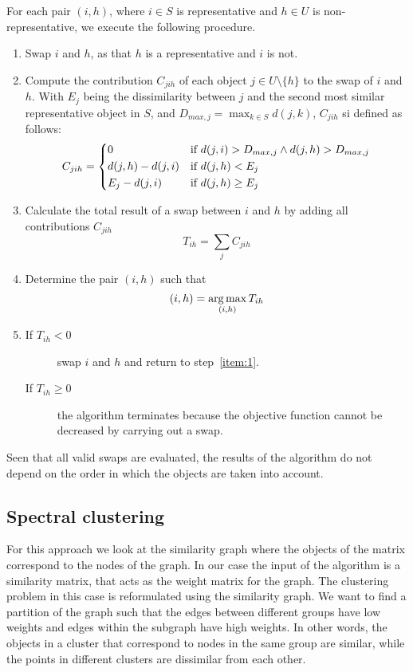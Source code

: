 For each pair $(i,h)$, where $i \in S$ is representative and $h \in U$ is non-representative, we execute the following procedure.
\begin{enumerate}
    \item Swap $i$ and $h$, as that $h$ is a representative and $i$ is not.\label{item:1}
    \item Compute the contribution $C_{jih}$ of each object $j \in U\setminus \{h\}$ to the swap of $i$ and $h$. With $E_j$ being the dissimilarity between $j$ and the second most similar representative object in $S$, and $D_{max,j} = \max_{k\in S}{d(j,k)}$, $C_{jih}$ si defined as follows:
    \begin{equation*}
        C_{jih}=
        \begin{dcases}
            0 & \text{if } d(j,i)> D_{max,j}\land d(j,h)> D_{max,j}\\
            d(j,h)-d(j,i) & \text{if } d(j,h)<E_j  \\
            E_j-d(j,i) & \text{if } d(j,h)\geq E_j \\
        \end{dcases}
    \end{equation*}  
    \item Calculate the total result of a swap between $i$ and $h$ by adding all contributions $C_{jih}$
    \begin{equation*}
        T_{ih}=\sum_j{C_{jih}}
    \end{equation*}
    \item Determine the pair $(i,h)$ such that
    \begin{equation*}
        (i,h)=\operatorname*{arg\,max}_{(i,h)}{T_{ih}}
    \end{equation*}
    \item 
    \begin{description}
        \item[If \boldmath$T_{ih}<0$] swap $i$ and $h$ and return to step~\ref{item:1}.
        \item[If \boldmath$T_{ih}\geq 0$] the algorithm terminates because the objective function cannot be decreased by carrying out a swap.
    \end{description}
\end{enumerate}
Seen that all valid swaps are evaluated, the results of the algorithm do not depend on the order in which the objects are taken into account.

\subsection{Spectral clustering}\label{clustering_spectral}
For this approach we look at the similarity graph where the objects of the matrix correspond to the nodes of the graph. In our case the input of the algorithm is a similarity matrix, that acts as the weight matrix for the graph. The clustering problem in this case is reformulated using the similarity graph. We want to find a partition of the graph such that the edges between different groups have low weights and edges within the subgraph have high weights. In other words, the objects in a cluster that correspond to nodes in the same group are similar, while the points in different clusters are dissimilar from each other.

